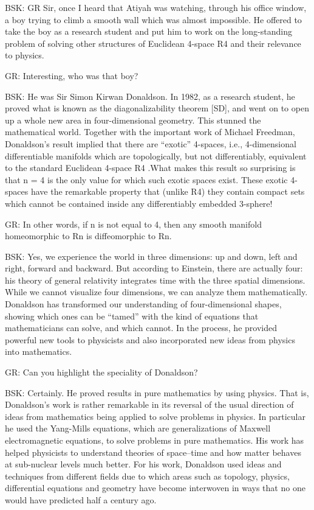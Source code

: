 BSK: GR Sir, once I heard that Atiyah was watching, through his office window, a boy trying to climb a smooth wall which was almost impossible. He offered to take the boy as a research student and put him to work on the long-standing problem of solving other structures of Euclidean 4-space R4 and their relevance to physics.

GR: Interesting, who was that boy?

BSK: He was Sir Simon Kirwan Donaldson. In 1982, as a research student, he proved what is known as the diagonalizability theorem [SD], and went on to open up a whole new area in four-dimensional geometry. This stunned the mathematical world. Together with the important work of Michael Freedman, Donaldson's result implied that there are “exotic” 4-spaces, i.e., 4-dimensional differentiable manifolds which are topologically, but not differentiably, equivalent to the standard Euclidean 4-space R4 .What makes this result so surprising is that n = 4 is the only value for which such exotic spaces exist. These exotic 4-spaces have the remarkable property that (unlike R4) they contain compact sets which cannot be contained inside any differentiably embedded 3-sphere!

GR: In other words, if n is not equal to 4, then any smooth manifold homeomorphic to Rn is diffeomorphic to Rn.

BSK:  Yes, we experience the world in three dimensions: up and down, left and right, forward and backward. But according to Einstein, there are actually four: his theory of general relativity integrates time with the three spatial dimensions. While we cannot visualize four dimensions, we can analyze them mathematically. Donaldson has transformed our understanding of four-dimensional shapes, showing which ones can be “tamed” with the kind of equations that mathematicians can solve, and which cannot. In the process, he provided powerful new tools to physicists and also incorporated new ideas from physics into mathematics.

GR: Can you highlight the speciality of Donaldson?

BSK: Certainly. He proved results in pure mathematics by using physics. That is, Donaldson’s work is rather remarkable in its reversal of the usual direction of ideas from mathematics being applied to solve problems in physics. In particular he used the Yang-Mills equations, which are generalizations of Maxwell electromagnetic equations, to solve problems in pure mathematics.  His work has helped physicists to understand theories of space–time and how matter behaves at sub-nuclear levels much better. For his work, Donaldson used ideas and techniques from different fields due to which areas such as topology, physics, differential equations and geometry have become interwoven in ways that no one would have predicted half a century ago.

